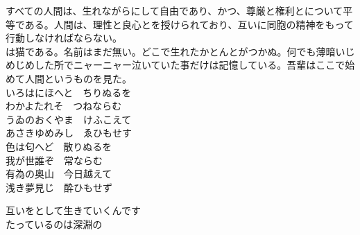 
すべての人間は、生れながらにして自由であり、かつ、尊厳と権利とについて平等である。人間は、理性と良心とを授けられており、互いに同胞の精神をもって行動しなければならない。\\

は猫である。名前はまだ無い。どこで生れたかとんとがつかぬ。何でも薄暗いじめじめした所でニャーニャー泣いていた事だけは記憶している。吾輩はここで始めて人間というものを見た。\\

いろはにほへと　ちりぬるを \\
わかよたれそ　つねならむ \\
うゐのおくやま　けふこえて \\
あさきゆめみし　ゑひもせす \\

色は匂へど　散りぬるを \\
我が世誰ぞ　常ならむ \\
有為の奥山　今日越えて \\
浅き夢見じ　酔ひもせず \\

\vspace{3em}

互いをとして生きていくんです \\

たっているのは深淵の \\
